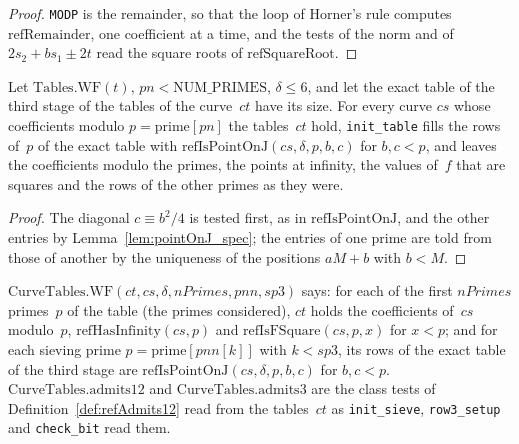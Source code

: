 \begin{proof}
  \leanok
  \texttt{MODP} is the remainder, so that the loop of Horner's rule computes
  $\mathrm{refRemainder}$, one coefficient at a time, and the tests of the norm and of
  $2 s_2 + b s_1 \pm 2 t$ read the square roots of $\mathrm{refSquareRoot}$.
\end{proof}

\begin{lemma}\label{lem:initTable_spec}
  \leanok
  Let $\mathrm{Tables.WF}(t)$, $\mathit{pn} < \mathrm{NUM\_PRIMES}$, $\delta \le 6$, and let the
  exact table of the third stage of the tables of the curve~$\mathit{ct}$ have its size. For every
  curve $\mathit{cs}$ whose coefficients modulo $p = \mathrm{prime}[\mathit{pn}]$ the
  tables~$\mathit{ct}$ hold, \texttt{init\_table} fills the rows of~$p$ of the exact table with
  $\mathrm{refIsPointOnJ}(\mathit{cs}, \delta, p, b, c)$ for $b, c < p$, and leaves the coefficients
  modulo the primes, the points at infinity, the values of~$f$ that are squares and the rows of the
  other primes as they were.
\end{lemma}

\begin{proof}
  \leanok
  The diagonal $c \equiv b^2 / 4$ is tested first, as in $\mathrm{refIsPointOnJ}$, and the other
  entries by Lemma~\ref{lem:pointOnJ_spec}; the entries of one prime are told from those of another
  by the uniqueness of the positions $a M + b$ with $b < M$.
\end{proof}

\begin{definition}\label{def:CurveTables.WF}
  \leanok
  $\mathrm{CurveTables.WF}(\mathit{ct}, \mathit{cs}, \delta, \mathit{nPrimes}, \mathit{pnn},
  \mathit{sp3})$ says: for each of the first $\mathit{nPrimes}$ primes~$p$ of the table (the primes
  considered), $\mathit{ct}$ holds the coefficients of~$\mathit{cs}$ modulo~$p$,
  $\mathrm{refHasInfinity}(\mathit{cs}, p)$ and $\mathrm{refIsFSquare}(\mathit{cs}, p, x)$ for
  $x < p$; and for each sieving prime $p = \mathrm{prime}[\mathit{pnn}[k]]$ with $k < \mathit{sp3}$,
  its rows of the exact table of the third stage are
  $\mathrm{refIsPointOnJ}(\mathit{cs}, \delta, p, b, c)$ for $b, c < p$.
  $\mathrm{CurveTables.admits12}$ and $\mathrm{CurveTables.admits3}$ are the class tests of
  Definition~\ref{def:refAdmits12} read from the tables~$\mathit{ct}$ as \texttt{init\_sieve},
  \texttt{row3\_setup} and \texttt{check\_bit} read them.
\end{definition}

